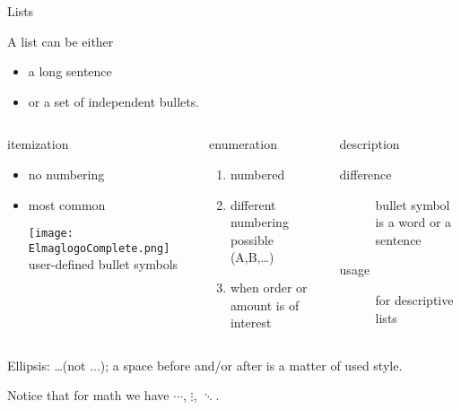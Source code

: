 \documentclass[xcolor=dvipsnames, aspectratio=169, handout, intlimits]{beamer}
\begin{document}
\begin{frame}{Lists}

\vspace{-0.5cm}
A list can be either
\begin{itemize}
\item a long sentence
\item or a set of independent bullets.
\end{itemize}

\vspace{0.5cm}
\begin{columns}[t]
\begin{column}{0.33\textwidth}	
	itemization 
	\begin{itemize}
		\item no numbering
		\item most common
		\item[{\texttt{[image: ElmaglogoComplete.png]}}] user-defined bullet symbols
	\end{itemize}
\end{column}
\begin{column}{0.33\textwidth}	
	enumeration
	\begin{enumerate}
		\item numbered
		\item different numbering possible (A,B,\dots)
		\item when order or amount is of interest
	\end{enumerate}
\end{column}
\begin{column}{0.33\textwidth}	
	description
	\begin{description}
		\item[difference] bullet symbol is a word or a sentence
		\item[usage] for descriptive lists
	\end{description}
\end{column}
\end{columns}

\vspace{0.25cm}
Ellipsis: \dots (not ...); a space before and/or after is a matter of used style.

Notice that for math we have $\cdots$, $\vdots$, $\ddots$.

\end{frame}
\end{document}
